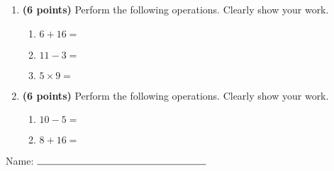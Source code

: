 \documentclass[12pt]{amsart}
\begin{document}
\newpage
\begin{enumerate}
\item {\bf (6 points)} 
 Perform the following operations. Clearly show your work. \begin{enumerate}


\def \a{6}\def \b{16}\def \apb{22}

 
\item $\a + \b = $

\vspace{2cm}
\def \a{11}\def \dif{8}\def \b{3}

 
\item $\a - \b = $

\vspace{2cm}
\def \a{5}\def \b{9}\def \ab{14}

 
\item $\a \times \b = $ 

\vspace{2cm}
\def \vshift{-1}\def \hshift{-4}\def \chang{-2}\def \findval{-6}\def \yval{3}

 
\end{enumerate}


\newpage
\item {\bf (6 points)} 
 Perform the following operations. Clearly show your work. \begin{enumerate}


\def \a{10}\def \dif{5}\def \b{5}

 
\item $\a - \b = $

\vspace{2cm}
\def \a{8}\def \b{16}\def \apb{24}

 
\item $\a + \b = $

\vspace{2cm}
\def \vshift{-5}\def \hshift{-4}\def \chang{1}\def \findval{-3}\def \yval{-7}

 
\end{enumerate}


\newpage\end{enumerate}\graphicspath{{/Users/jilan/Downloads/Randomizer/Randomizer/Sample Course/Sample Assessment 2/}}\setcounter{page}{1}


\thispagestyle{fancy}

 
\noindent Name: $\rule{6cm}{0.15mm}$

\vspace{.2cm}
\end{document}

